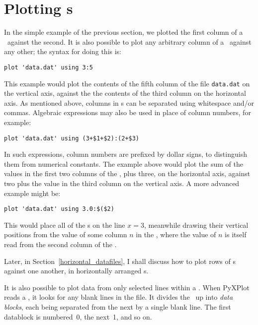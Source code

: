 \section{Plotting \Datafile s}
\label{plot_datafiles}

In the simple example of the previous section, we plotted the first column of a
\datafile\ against the second. It is also possible to plot any arbitrary column
of a \datafile\ against any other; the syntax for doing this is:

\begin{verbatim}
plot 'data.dat' using 3:5
\end{verbatim}

\noindent This example would plot the contents of the fifth column of the file
{\tt data.dat} on the vertical axis, against the the contents of the third
column on the horizontal axis. As mentioned above, columns in \datafile s can be
separated using whitespace and/or commas.  Algebraic expressions may also be
used in place of column numbers, for example:

\begin{verbatim}
plot 'data.dat' using (3+$1+$2):(2+$3)
\end{verbatim}

\noindent In such expressions, column numbers are prefixed by dollar signs, to
distinguish them from numerical constants. The example above would plot the sum
of the values in the first two columns of the \datafile, plus three, on the
horizontal axis, against two plus the value in the third column on the vertical
axis. A more advanced example might be:

\begin{verbatim}
plot 'data.dat' using 3.0:$($2)
\end{verbatim}

\noindent This would place all of the \datapoint s on the line $x=3$, meanwhile
drawing their vertical positions from the value of some column $n$ in the
\datafile, where the value of $n$ is itself read from the second column of the
\datafile.

Later, in Section~\ref{horizontal_datafiles}, I shall discuss how to plot rows
of \datafile s against one another, in horizontally arranged \datafile s.

It is also possible to plot data from only selected lines within a \datafile.
When PyXPlot reads a \datafile, it looks for any blank lines in the file. It
divides the \datafile\ up into {\it data blocks}, each being separated from the
next by a single blank line. The first datablock is numbered~0, the next~1, and
so on.  

